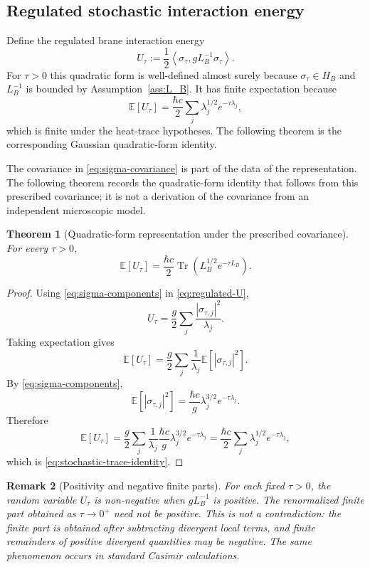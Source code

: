 \documentclass[11pt]{article}
\newtheorem{theorem}{Theorem}[section]
\newtheorem{remark}[theorem]{Remark}
\newcommand{\E}{\mathbb{E}}
\newcommand{\Tr}{\operatorname{Tr}}
\newcommand{\braket}[2]{\left\langle #1,#2\right\rangle}
\begin{document}
\subsection{Regulated stochastic interaction energy}

Define the regulated brane interaction energy
\begin{equation}
    U_\tau
    :=\frac12\braket{\sigma_\tau}{gL_B^{-1}\sigma_\tau}.
    \label{eq:regulated-U}
\end{equation}
For $\tau>0$ this quadratic form is well-defined almost surely because $\sigma_\tau\in H_B$ and $L_B^{-1}$ is bounded by Assumption~\ref{ass:L_B}.  It has finite expectation because
\[
    \E[U_\tau]
    =\frac{\hbar c}{2}\sum_j\lambda_j^{1/2}e^{-\tau\lambda_j},
\]
which is finite under the heat-trace hypotheses.  The following theorem is the corresponding Gaussian quadratic-form identity.

The covariance in \eqref{eq:sigma-covariance} is part of the data of the
representation.  The following theorem records the quadratic-form identity
that follows from this prescribed covariance; it is not a derivation of the
covariance from an independent microscopic model.

\begin{theorem}[Quadratic-form representation under the prescribed covariance]
\label{thm:stochastic-trace}
For every $\tau>0$,
\begin{equation}
    \E[U_\tau]
    =\frac{\hbar c}{2}\Tr\left(L_B^{1/2}e^{-\tau L_B}\right).
    \label{eq:stochastic-trace-identity}
\end{equation}
\end{theorem}

\begin{proof}
Using \eqref{eq:sigma-components} in \eqref{eq:regulated-U},
\[
    U_\tau
    =\frac{g}{2}\sum_j\frac{|\sigma_{\tau,j}|^2}{\lambda_j}.
\]
Taking expectation gives
\[
    \E[U_\tau]
    =\frac{g}{2}\sum_j\frac{1}{\lambda_j}
      \E[|\sigma_{\tau,j}|^2].
\]
By \eqref{eq:sigma-components},
\[
    \E[|\sigma_{\tau,j}|^2]
    =\frac{\hbar c}{g}\lambda_j^{3/2}e^{-\tau\lambda_j}.
\]
Therefore
\[
    \E[U_\tau]
    =\frac{g}{2}\sum_j\frac{1}{\lambda_j}\frac{\hbar c}{g}\lambda_j^{3/2}e^{-\tau\lambda_j}
    =\frac{\hbar c}{2}\sum_j\lambda_j^{1/2}e^{-\tau\lambda_j},
\]
which is \eqref{eq:stochastic-trace-identity}.
\end{proof}

\begin{remark}[Positivity and negative finite parts]
For each fixed $\tau>0$, the random variable $U_\tau$ is non-negative when $gL_B^{-1}$ is positive.  The renormalized finite part obtained as $\tau\to0^+$ need not be positive.  This is not a contradiction: the finite part is obtained after subtracting divergent local terms, and finite remainders of positive divergent quantities may be negative.  The same phenomenon occurs in standard Casimir calculations.
\end{remark}
\end{document}
